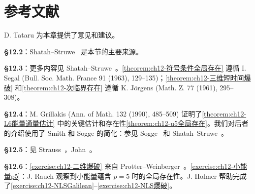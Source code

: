 \documentclass[../../main.tex]{subfiles}
\begin{document}
\section{参考文献}\label{section:ch12-参考文献}

D. Tataru 为本章提供了意见和建议。

\textbf{\S12.2}：Shatah--Struwe~\cite{S-S} 是本节的主要来源。

\textbf{\S12.3}：更多内容见 Shatah--Struwe~\cite{S-S}。\cref{theorem:ch12-符号条件全局存在} 遵循 I. Segal (Bull. Soc. Math. France 91 (1963), 129--135)；\cref{theorem:ch12-三维短时间爆破} 和\cref{theorem:ch12-次临界存在} 遵循 K. J\"orgens (Math. Z. 77 (1961), 295--308)。

\textbf{\S12.4}：M. Grillakis (Ann. of Math. 132 (1990), 485--509) 证明了\cref{theorem:ch12-L6能量通量估计} 中的关键估计和存在性\cref{theorem:ch12-u5全局存在}。我们对后者的介绍使用了 Smith 和 Sogge 的简化：参见 Sogge~\cite{So} 和 Shatah--Struwe~\cite{S-S}。

\textbf{\S12.5}：见 Strauss~\cite{St1}，John~\cite{J3}。

\textbf{\S12.6}：\cref{exercise:ch12-二维爆破} 来自 Protter--Weinberger~\cite{P-W}。\cref{exercise:ch12-小能量p5}：J. Rauch 观察到小能量蕴含 $p=5$ 时的全局存在性。J. Holmer 帮助完成了\cref{exercise:ch12-NLSGalilean}--\cref{exercise:ch12-NLS爆破}。
\end{document}
